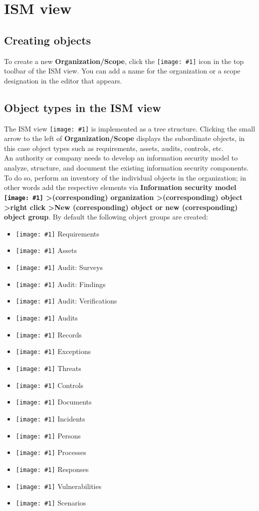 \documentclass[a4paper,10pt]{book}
\newcommand{\icon}[1]{\texttt{[image: \#1]}}
\begin{document}
\section{ISM view}
\subsection{Creating objects} \label{Creating objects}
To create a new \textbf{Organization/Scope}, click the \icon{Icon/Oeffnen.png}
icon in the top toolbar of the ISM view. You can add a name for the organization or a scope designation in the editor that appears.

\subsection{Object types in the ISM view}
The ISM view \icon{Icon/Informationssicherheitsmodell.png}
is implemented as a tree structure. Clicking the small arrow to the left of \textbf{Organization/Scope}
displays the subordinate objects, in this case object types such as requirements, assets, audits, controls, etc.
\newline\\
An authority or company needs to develop an information security model to analyze, structure,
and document the existing information security components. To do so, perform an inventory of
the individual objects in the organization; in other words add the respective elements via
\textbf{Information security model \icon{Icon/Informationssicherheitsmodell.png}
\textgreater (corresponding) organization \textgreater (corresponding) object
\textgreater right click \textgreater New (corresponding) object or new (corresponding) object group}.
By default the following object groups are created:
\begin{itemize}
\item \icon{Icon/16-paper-gavel-alt.png} Requirements
\item \icon{Icon/Asset.png} Assets
\item \icon{Icon/Clipboard_comment.png} Audit: Surveys
\item \icon{Icon/Clipboard_report.png} Audit: Findings
\item \icon{Icon/Clipboard_eye.png} Audit: Verifications
\item \icon{Icon/Clipboard_audit.png} Audits
\item \icon{Icon/Text.png} Records
\item \icon{Icon/16-paper-excerpt-yellow.png} Exceptions
\item \icon{Icon/Lightening.png} Threats
\item \icon{Icon/Controls.png} Controls
\item \icon{Icon/Document.png} Documents
\item \icon{Icon/Incident.png} Incidents
\item \icon{Icon/Mitarbeiter.png} Persons
\item \icon{Icon/Prozesse.png} Processes
\item \icon{Icon/Reaktionen.png} Responses
\item \icon{Icon/Schwachstellen.png} Vulnerabilities
\item \icon{Icon/Szenarios.png} Scenarios
\end{itemize}
\end{document}
